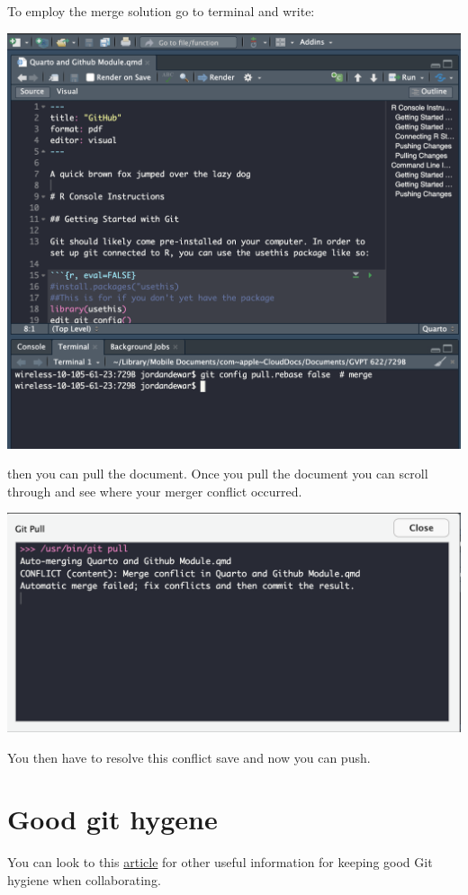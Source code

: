 \documentclass[
  letterpaper,
  DIV=11,
  numbers=noendperiod]{scrartcl}
\begin{document}
To employ the merge solution go to terminal and write:

\includegraphics{figures/37.png}

then you can pull the document. Once you pull the document you can
scroll through and see where your merger conflict occurred.

\includegraphics{figures/38.png}

You then have to resolve this conflict save and now you can push.

\hypertarget{good-git-hygene}{%
\section{Good git hygene}\label{good-git-hygene}}

You can look to this
\href{https://betterprogramming.pub/six-rules-for-good-git-hygiene-5006cf9e9e2}{article}
for other useful information for keeping good Git hygiene when
collaborating.
\end{document}
